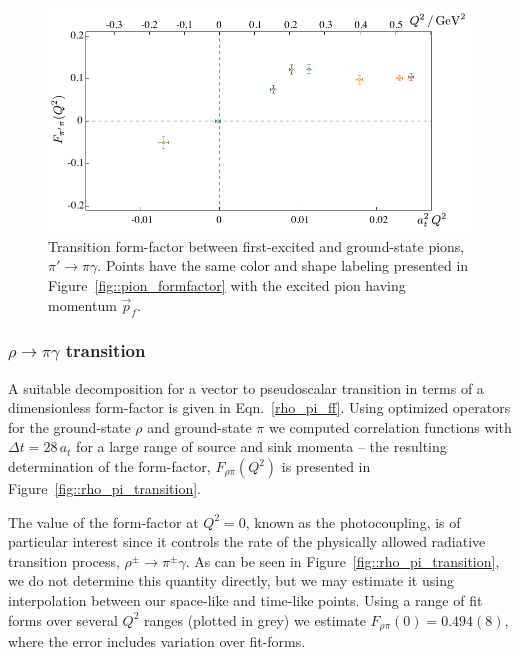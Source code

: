 \documentclass[twocolumn,amsmath,amssymb,prd,10pt,floatfix, 
superscriptaddress,nofootinbib, showpacs, preprintnumbers]{revtex4-1}
\begin{document}
\begin{figure}[h]
  \includegraphics[width=1.05\linewidth]{fig17.pdf}
  \caption{Transition form-factor between first-excited and ground-state pions, $\pi' \to \pi \gamma$. Points have the same color and shape labeling presented in Figure~\ref{fig::pion_formfactor} with the excited pion having momentum $\vec{p}_f$. 
  \label{fig::pi_pistar_transition}}
\end{figure}







\subsubsection{$\rho \rightarrow \pi \gamma$ transition}\label{rhopigamma}


A suitable decomposition for a vector to pseudoscalar transition in terms of a dimensionless form-factor is given in Eqn.~\ref{rho_pi_ff}. Using optimized operators for the ground-state $\rho$ and ground-state $\pi$ we computed correlation functions with $\Delta t = 28\, a_t$ for a large range of source and sink momenta -- the resulting determination of the form-factor, $F_{\rho \pi}(Q^2)$ is presented in Figure~\ref{fig::rho_pi_transition}.

The value of the form-factor at $Q^2=0$, known as the photocoupling, is of particular interest since it controls the rate of the physically allowed radiative transition process, $\rho^\pm \to \pi^\pm \gamma$. As can be seen in Figure~\ref{fig::rho_pi_transition}, we do not determine this quantity directly, but we may estimate it using interpolation between our space-like and time-like points. Using a range of fit forms over several $Q^2$ ranges (plotted in grey) we estimate $F_{\rho \pi}(0) = 0.494(8)$, where the error includes variation over fit-forms.
\end{document}
